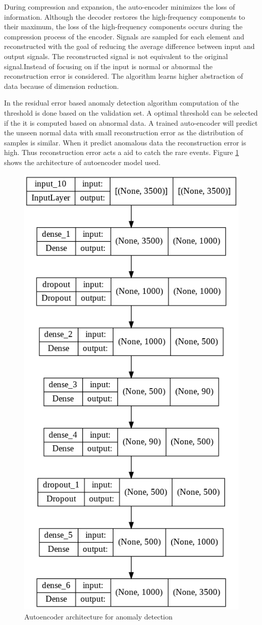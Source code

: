     
    During compression and expansion, the auto-encoder minimizes the loss of information. Although the decoder restores the high-frequency components to their maximum, the loss of the high-frequency components occurs during the compression process of the encoder. Signals are sampled for each element and reconstructed with the goal of reducing the average difference between input and output signals. The reconstructed signal is not equivalent to the original signal.Instead of focusing on if the input is normal or abnormal the reconstruction error is considered. The algorithm learns higher abstraction of data because of dimension reduction.
    
    In the residual error based anomaly detection algorithm computation of the threshold is done based on the validation set. A optimal threshold can be selected if the it is computed based on abnormal data. A trained auto-encoder will predict the unseen normal data with small reconstruction error as the distribution of samples is similar. When it predict anomalous data the reconstruction error is high. Thus reconstruction error acts a aid to catch the rare events. 
    Figure \ref{ne11} shows the architecture of autoencoder model used. 
   
   \begin{figure}[h]
   	\centering
   	\includegraphics[width=0.49\linewidth]{images/aaut.png}
   	\caption{Autoencoder architecture for anomaly detection }
   	\label{ne11}
   \end{figure}
  
